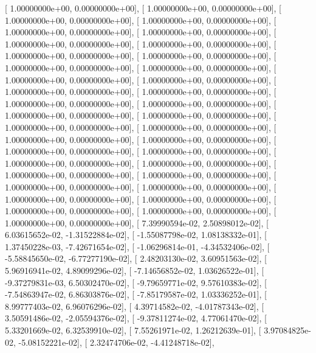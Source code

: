 \documentclass{article}
\begin{document}
       [  1.00000000e+00,   0.00000000e+00],
       [  1.00000000e+00,   0.00000000e+00],
       [  1.00000000e+00,   0.00000000e+00],
       [  1.00000000e+00,   0.00000000e+00],
       [  1.00000000e+00,   0.00000000e+00],
       [  1.00000000e+00,   0.00000000e+00],
       [  1.00000000e+00,   0.00000000e+00],
       [  1.00000000e+00,   0.00000000e+00],
       [  1.00000000e+00,   0.00000000e+00],
       [  1.00000000e+00,   0.00000000e+00],
       [  1.00000000e+00,   0.00000000e+00],
       [  1.00000000e+00,   0.00000000e+00],
       [  1.00000000e+00,   0.00000000e+00],
       [  1.00000000e+00,   0.00000000e+00],
       [  1.00000000e+00,   0.00000000e+00],
       [  1.00000000e+00,   0.00000000e+00],
       [  1.00000000e+00,   0.00000000e+00],
       [  1.00000000e+00,   0.00000000e+00],
       [  1.00000000e+00,   0.00000000e+00],
       [  1.00000000e+00,   0.00000000e+00],
       [  1.00000000e+00,   0.00000000e+00],
       [  1.00000000e+00,   0.00000000e+00],
       [  1.00000000e+00,   0.00000000e+00],
       [  1.00000000e+00,   0.00000000e+00],
       [  1.00000000e+00,   0.00000000e+00],
       [  1.00000000e+00,   0.00000000e+00],
       [  1.00000000e+00,   0.00000000e+00],
       [  1.00000000e+00,   0.00000000e+00],
       [  1.00000000e+00,   0.00000000e+00],
       [  1.00000000e+00,   0.00000000e+00],
       [  1.00000000e+00,   0.00000000e+00],
       [  1.00000000e+00,   0.00000000e+00],
       [  1.00000000e+00,   0.00000000e+00],
       [  1.00000000e+00,   0.00000000e+00],
       [  1.00000000e+00,   0.00000000e+00],
       [  1.00000000e+00,   0.00000000e+00],
       [  1.00000000e+00,   0.00000000e+00],
       [  7.39990594e-02,   2.50898012e-02],
       [  6.03615652e-02,  -1.31522884e-02],
       [ -1.55087798e-02,   1.08138332e-01],
       [  1.37450228e-03,  -7.42671654e-02],
       [ -1.06296814e-01,  -4.34532406e-02],
       [ -5.58845650e-02,  -6.77277190e-02],
       [  2.48203130e-02,   3.60951563e-02],
       [  5.96916941e-02,   4.89099296e-02],
       [ -7.14656852e-02,   1.03626522e-01],
       [ -9.37279831e-03,   6.50302470e-02],
       [ -9.79659771e-02,   9.57610383e-02],
       [ -7.54863947e-02,   6.86303876e-02],
       [ -7.85179587e-02,   1.03336252e-01],
       [  8.99777403e-02,   6.96076296e-02],
       [  4.39714582e-02,  -4.01787343e-02],
       [  3.50591486e-02,  -2.05594376e-02],
       [ -9.37811274e-02,   4.77061470e-02],
       [  5.33201669e-02,   6.32539910e-02],
       [  7.55261971e-02,   1.26212639e-01],
       [  3.97084825e-02,  -5.08152221e-02],
       [  2.32474706e-02,  -4.41248718e-02],
\end{document}
